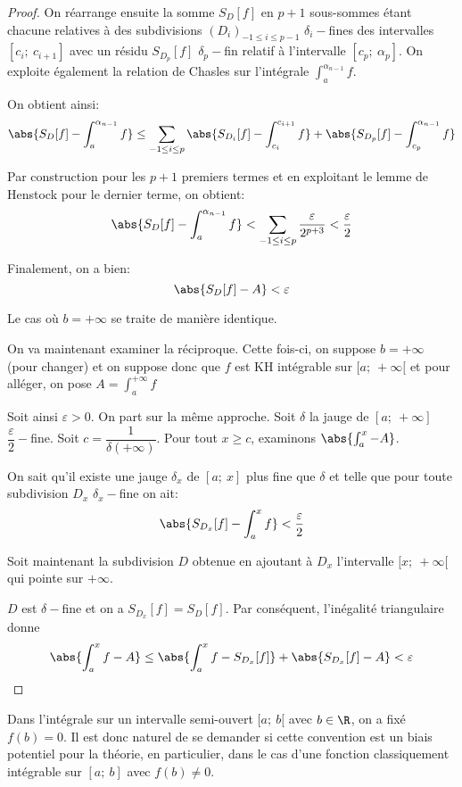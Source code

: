 \begin{proof}
On réarrange ensuite la somme $S_D[f]$ en $p+1$ sous-sommes étant chacune relatives à des subdivisions $(D_i)_{-1 \leq i \leq p-1}$ $\delta_i-$fines des intervalles $[c_i;~c_{i+1}]$ avec un résidu $S_{D_p}[f]$ $\delta_p-$fin relatif à l'intervalle $[c_p;~\alpha_p]$. On exploite également la relation de Chasles sur l'intégrale $\int_a^{\alpha_{n-1}} f$.

On obtient ainsi:
\[
\abs{S_D[f]-\int_a^{\alpha_{n-1}} f} \leq \sum \limits_{-1 \leq i \leq p}\abs{S_{D_i}[f] - \int_{c_i}^{c_{i+1}}f} + \abs{S_{D_p}[f] - \int_{c_p}^{\alpha_{n-1}}f}
\]

Par construction pour les $p+1$ premiers termes et en exploitant le lemme de Henstock pour le dernier terme, on obtient:
\[
\abs{S_D[f]-\int_a^{\alpha_{n-1}} f} < \sum \limits_{-1 \leq i \leq p} \dfrac{\varepsilon}{2^{p+3}} < \dfrac{\varepsilon}{2}
\]

Finalement, on a bien:
\[
\abs{S_D[f]-A} < \varepsilon
\]

Le cas où $b=+\infty$ se traite de manière identique.

On va maintenant examiner la réciproque. Cette fois-ci, on suppose $b = +\infty$ (pour changer) et on suppose donc que $f$ est KH intégrable sur $[a;~+\infty[$ et pour alléger, on pose $A = \int_a^{+\infty} f$

Soit ainsi $\varepsilon>0$. On part sur la même approche. Soit $\delta$ la jauge de $[a;~+\infty]$ $\dfrac{\varepsilon}{2}-$fine. Soit $c = \dfrac{1}{\delta(+\infty)}$. Pour tout $x \geq c$, examinons $\abs{\int_a^x - A}$.

On sait qu'il existe une jauge $\delta_x$ de $[a;~x]$ plus fine que $\delta$ et telle que pour toute subdivision $D_x$ $\delta_x-$fine on ait:
\[
\abs{S_{D_x}[f]-\int_a^x f} < \dfrac{\varepsilon}{2}
\]

Soit maintenant la subdivision $D$ obtenue en ajoutant à $D_x$ l'intervalle $[x;~+\infty[$ qui pointe sur $+\infty$.

$D$ est $\delta-$fine et on a $S_{D_x}[f] = S_D[f]$. Par conséquent, l'inégalité triangulaire donne
\[
\abs{\int_a^x f - A} \leq \abs{\int_a^x f - S_{D_x}[f]} + \abs{S_{D_x}[f] - A} < \varepsilon
\]
\end{proof}

Dans l'intégrale sur un intervalle semi-ouvert $[a;~b[$ avec $b \in \R$, on a fixé $f(b)=0$. Il est donc naturel de se demander si cette convention est un biais potentiel pour la théorie, en particulier, dans le cas d'une fonction \og classiquement intégrable \fg{} sur $[a;~b]$ avec $f(b) \neq 0$. 

